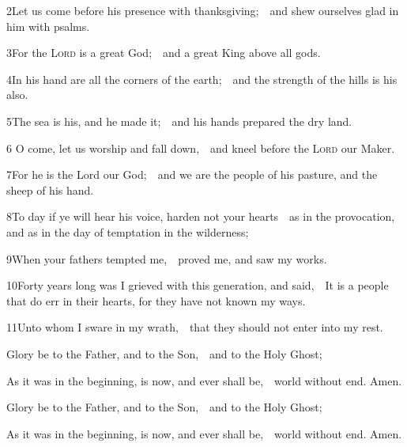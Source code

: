 2\enspace Let us come before his presence with thanksgiving;\ \star\ and shew ourselves glad in him with psalms.

3\enspace For the {\scshape Lord} is a great God;\ \star\ and a great King above all gods.

4\enspace In his hand are all the corners of the earth;\ \star\ and the strength of the hills is his also.

5\enspace  The sea is his, and he made it;\ \star\ and his hands prepared the dry land.

6 O come, let us worship and fall down,\ \star\ and kneel before the {\scshape Lord} our Maker.

7\enspace  For he is the Lord our God;\ \star\ and we are the people of his pasture, and the sheep of his hand.

8\enspace  To day if ye will hear his voice, harden not your hearts\ \star\ as in the provocation, and as in the day of temptation in the wilderness;

9\enspace  When your fathers tempted me,\ \star\ proved me, and saw my works.

10\enspace  Forty years long was I grieved with this generation, and said,\ \star\ It is a people that do err in their hearts, for they have not known my ways.

11\enspace  Unto whom I sware in my wrath,\ \star\ that they should not enter into my rest.

Glory be to the Father, and to the Son,\ \star\ and to the Holy Ghost;

As it was in the beginning, is now, and ever shall be,\ \star\ world without end. Amen.

\bigskip
{}
Glory be to the Father, and to the Son,\ \star\ and to the Holy Ghost;

As it was in the beginning, is now, and ever shall be,\ \star\ world without end. Amen.

\bigskip
{}

